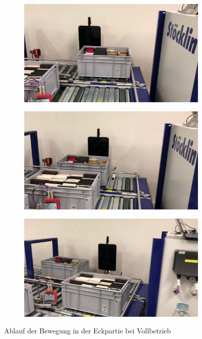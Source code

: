 \documentclass[parskip=full, a4paper]{scrartcl}
\begin{document}
\begin{figure}[htb]
	\centering
	\begin{subfigure}{0.3\linewidth}
		\includegraphics[keepaspectratio,width=\linewidth]{AblaufEckpartie01.png}
	\end{subfigure}
	\begin{subfigure}{0.3\linewidth}
		\includegraphics[keepaspectratio,width=\linewidth]{AblaufEckpartie02.png}
	\end{subfigure}
	\begin{subfigure}{0.3\linewidth}
		\includegraphics[keepaspectratio,width=\linewidth]{AblaufEckpartie03.png}
	\end{subfigure}
	\caption{Ablauf der Bewegung in der Eckpartie bei Vollbetrieb}
	\label{fig:AblaufEckpartie}
\end{figure}
\end{document}
